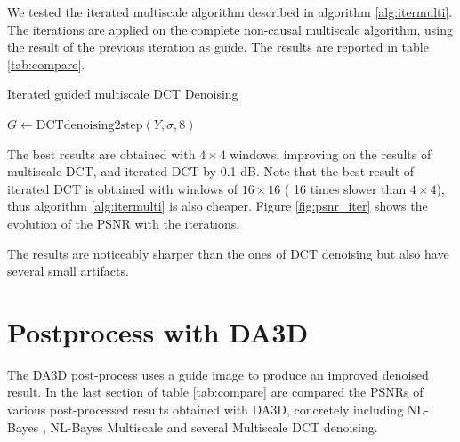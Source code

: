 \documentclass{ipol}
\begin{document}
We tested the iterated multiscale algorithm described in algorithm \ref{alg:itermulti}. The iterations are applied on the complete non-causal multiscale algorithm, using the result of the previous iteration as guide. The results are reported in table \ref{tab:compare}.


\begin{algorithm}[h!]
\caption{Iterated guided multiscale DCT Denoising}
\label{alg:itermulti}

     $G \gets \text{DCTdenoising2step}(Y,  \sigma, 8)$ \hfill  {}

  
\end{algorithm}


The best results are obtained with $4\times 4$ windows, improving on the results of multiscale DCT, and iterated DCT  by 0.1 dB.
Note that the best result of iterated DCT is obtained with windows of $16\times 16$ ( 16 times slower than $4\times 4$), thus algorithm \ref{alg:itermulti} is also cheaper. Figure \ref{fig:psnr_iter} shows the evolution of the PSNR with the iterations.
 
The results are noticeably sharper than the ones of DCT denoising but also have several small artifacts.





\section{Postprocess with DA3D}

The DA3D post-process \cite{Pierazzo2015} uses a guide image to produce an improved denoised result. In the last section of table \ref{tab:compare} are compared the PSNRs of various  post-processed results obtained with DA3D, concretely including NL-Bayes \cite{Lebrun2013}, NL-Bayes Multiscale and several Multiscale DCT denoising. 
\end{document}
